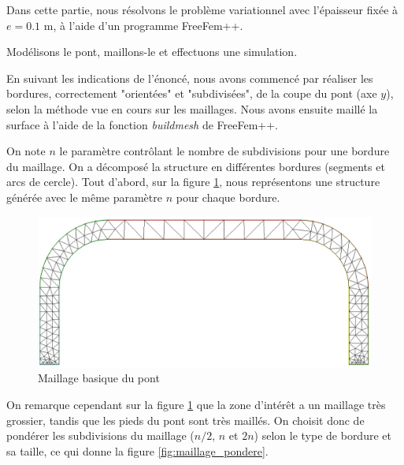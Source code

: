 
Dans cette partie, nous résolvons le problème variationnel avec l'épaisseur fixée à $e=0.1$ m, à l'aide d'un programme FreeFem++.


\begin{problem}{3}
    Modélisons le pont, maillons-le et effectuons une simulation.
\end{problem}


    En suivant les indications de l'énoncé, nous avons commencé par réaliser les bordures, correctement "orientées" et "subdivisées", de la coupe du pont (axe $y$),
    selon la méthode vue en cours sur les maillages. Nous avons ensuite maillé la surface à l'aide de la fonction \emph{buildmesh} de FreeFem++.

    On note $n$ le paramètre contrôlant le nombre de subdivisions pour une bordure du maillage. On a décomposé la structure en différentes bordures (segments et arcs de cercle).
    Tout d'abord, sur la figure \ref{fig:maillage_default}, nous représentons une structure générée avec le même paramètre $n$ pour chaque bordure.

    \begin{figure}      
        \begin{center}
        
            \includegraphics[width=12cm]{imgs/all_maillage_default.PNG}
            \caption{Maillage basique du pont}
            \label{fig:maillage_default}
        
        \end{center}
    \end{figure}

    On remarque cependant sur la figure \ref{fig:maillage_default} que la zone d'intérêt a un maillage très grossier, tandis que les pieds du pont sont très maillés. 
    On choisit donc de pondérer les subdivisions du maillage ($n/2$, $n$ et $2n$) selon le type de bordure et sa taille, ce qui donne la figure \ref{fig:maillage_pondere}.
    
